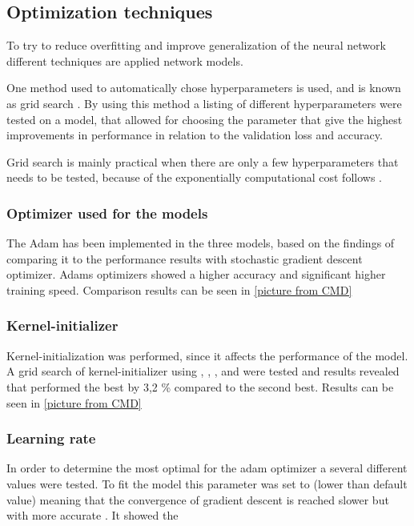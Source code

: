 \subsection{Optimization techniques}
To try to reduce overfitting and improve generalization of the neural network different techniques are applied network models.

One method used to automatically chose hyperparameters is used, and is known as grid search \citep{Goodfellow2016}. By using this method a listing of different hyperparameters were tested on a model, that allowed for choosing the parameter that give the highest improvements in performance in relation to the validation loss and accuracy.  

Grid search is mainly practical when there are only a few hyperparameters that needs to be tested, because of the exponentially computational cost follows \citep{Goodfellow2016}.   

\subsubsection{Optimizer used for the models}
The Adam has been implemented in the three models, based on the findings of comparing it to the performance results with stochastic gradient descent optimizer. Adams optimizers showed a higher accuracy and significant higher training speed. Comparison results can be seen in \ref{picture from CMD}

\subsubsection{Kernel-initializer}
Kernel-initialization was performed, since it affects the performance of the model.
A grid search of kernel-initializer using , , ,  and  were tested and results revealed that  performed the best by 3,2 \% compared to the second best. Results can be seen in \ref{picture from CMD}

\subsubsection{Learning rate}
In order to determine the most optimal  for the adam optimizer a several different values were tested. To fit the model this parameter was set to  (lower than default value) meaning that the convergence of gradient descent is reached slower but with more accurate . It showed the 

